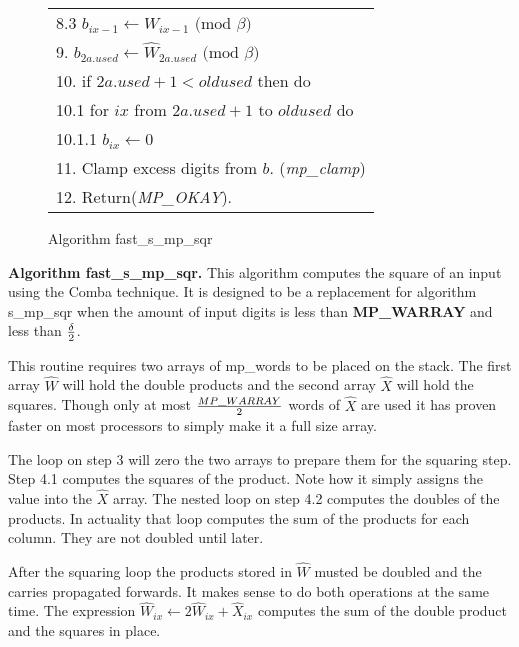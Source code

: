 \documentclass[b5paper]{book}
\begin{document}
\begin{figure}[!here]
\begin{small}
\begin{center}
\begin{tabular}{l}
\hspace{3mm}8.3 $b_{ix-1} \leftarrow W_{ix-1} \mbox{ (mod }\beta\mbox{)}$ \\
9.  $b_{2a.used} \leftarrow \hat W_{2a.used} \mbox{ (mod }\beta\mbox{)}$ \\
10.  if $2a.used + 1 < oldused$ then do \\
\hspace{3mm}10.1  for $ix$ from $2a.used + 1$ to $oldused$ do \\
\hspace{6mm}10.1.1  $b_{ix} \leftarrow 0$ \\
11.  Clamp excess digits from $b$.  (\textit{mp\_clamp}) \\
12.  Return(\textit{MP\_OKAY}). \\ 
\hline
\end{tabular}
\end{center}
\end{small}
\caption{Algorithm fast\_s\_mp\_sqr}
\end{figure}

\textbf{Algorithm fast\_s\_mp\_sqr.}
This algorithm computes the square of an input using the Comba technique.  It is designed to be a replacement for algorithm s\_mp\_sqr when
the amount of input digits is less than \textbf{MP\_WARRAY} and less than $\delta \over 2$.  

This routine requires two arrays of mp\_words to be placed on the stack.  The first array $\hat W$ will hold the double products and the second
array $\hat X$ will hold the squares.  Though only at most $MP\_WARRAY \over 2$ words of $\hat X$ are used it has proven faster on most 
processors to simply make it a full size array.

The loop on step 3 will zero the two arrays to prepare them for the squaring step.  Step 4.1 computes the squares of the product.  Note how 
it simply assigns the value into the $\hat X$ array.  The nested loop on step 4.2 computes the doubles of the products.  In actuality that loop
computes the sum of the products for each column.  They are not doubled until later.

After the squaring loop the products stored in $\hat W$ musted be doubled and the carries propagated forwards.  It makes sense to do both
operations at the same time.  The expression $\hat W_{ix} \leftarrow 2 \hat W_{ix} + \hat {X}_{ix}$ computes the sum of the double product and the
squares in place.  
\end{document}
